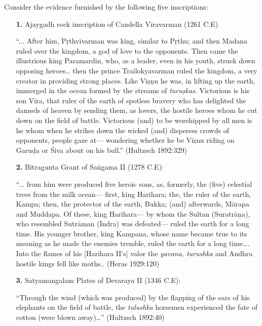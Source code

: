 Consider the evidence furnished by the following five inscriptions: 
\begin{itemize}
\itemsep=0pt
\item[{\bf 1.}] Ajaygadh rock inscription of Candella Vīravarman (1261 C.E) 

“... After him, Pṛthvīvarman was king, similar to Pṛthu; and then Madana ruled over the kingdom, a god of love to the opponents. Then came the illustrious king Paramardin, who, as a leader, even in his youth, struck down opposing heroes… then the prince Trailokyavarman ruled the kingdom, a very creator in providing strong places. Like Viṣṇu he was, in lifting up the earth, immerged in the ocean formed by the streams of {\sl turuṣkas}. Victorious is his son Vīra, that ruler of the earth of spotless bravery who has delighted the damsels of heaven by sending them, as lovers, the hostile heroes whom he cut down on the field of battle. Victorious (and) to be worshipped by all men is he whom when he strikes down the wicked (and) disperses crowds of opponents, people gaze at— wondering whether he be Viṣnu riding on Garuḍa or Śiva about on his bull.” 
\hfill (Hultzsch 1892:329)

\item[{\bf 2.}] Bitragunta Grant of Saṅgama II (1278 C.E): 

“... from him were produced five heroic sons, as, formerly, the (five) celestial trees from the milk ocean— first, king Harihara; the, the ruler of the earth, Kampa; then, the protector of the earth, Bukka; (and) afterwards, Mārapa and Muddapa. Of these, king Harihara— by whom the Sultan (Suratrāṇa), who resembled Sutrāman (Indra) was defeated— ruled the earth for a long time. His younger brother, king Kampana, whose name became true to its meaning as he made the enemies tremble, ruled the earth for a long time…. Into the flames of his [Harihara II’s] valor the {\sl yavana, turushka} and Andhra hostile kings fell like moths.. (Heras 1929:120) 

\item[{\bf 3.}] Satyamangalam Plates of Devaraya II (1346 C.E): 

“Through the wind (which was produced) by the flapping of the ears of his elephants on the field of battle, the {\sl tulushka} horsemen experienced the fate of cotton (were blown away)…” (Hultzsch 1892:40)


\end{itemize}
